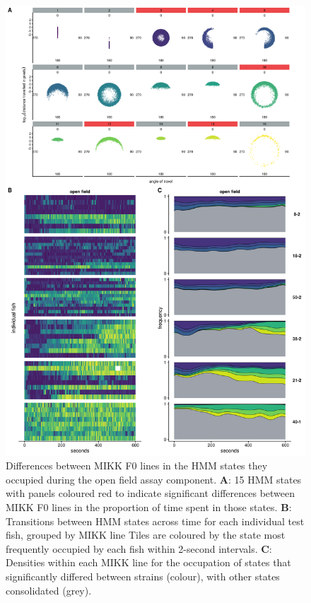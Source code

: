 \documentclass[
]{article}
\begin{document}
\begin{figure}
\includegraphics[width=1\linewidth]{figs/mikk_behaviour/select_0.08_15_dge_of} \caption{Differences between MIKK F0 lines in the HMM states they occupied during the open field assay component. \textbf{A}: 15 HMM states with panels coloured red to indicate significant differences between MIKK F0 lines in the proportion of time spent in those states. \textbf{B}: Transitions between HMM states across time for each individual test fish, grouped by MIKK line Tiles are coloured by the state most frequently occupied by each fish within 2-second intervals. \textbf{C}: Densities within each MIKK line for the occupation of states that significantly differed between strains (colour), with other states consolidated (grey).}\label{fig:F2-time-dge-of}
\end{figure}
\end{document}
